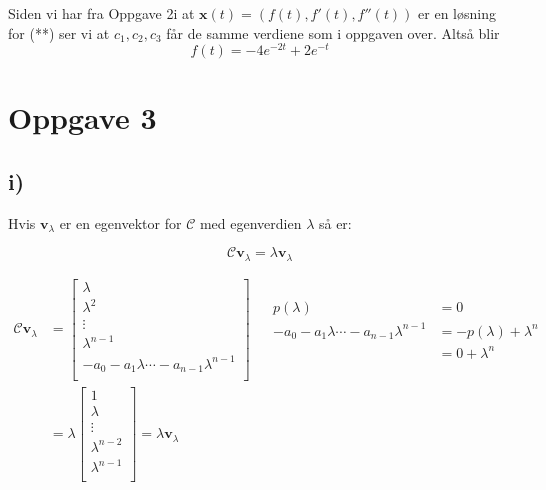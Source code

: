 \documentclass[a4paper, norsk, twoside, 10pt]{article}
\begin{document}
\begin{flushleft}
  Siden vi har fra Oppgave 2i at $\mathbf{x}(t)  = (f(t) , f'(t) , f''(t))$ er en løsning for (**) ser vi at $c_{1}, c_{2}, c_{3}$ får de samme verdiene som i oppgaven over. Altså blir
  \[f(t) = -4e^{-2t} + 2e^{-t}\]



  \section*{Oppgave 3}

  \subsection*{i)}

  Hvis $\mathbf{v}_{\lambda}$ er en egenvektor for $\mathcal{C}$ med egenverdien $\lambda$ så er:

  \[\mathcal{C}\mathbf{v}_{\lambda} = \lambda \mathbf{v}_{\lambda}\]

  \begin{align*}
    \mathcal{C}\mathbf{v}_{\lambda} &=
    \begin{bmatrix}
      \lambda \\
      \lambda^{2} \\
      \vdots \\
      \lambda^{n-1} \\
      -a_{0} - a_{1}\lambda \cdots -a_{n-1}\lambda^{n-1}\\
    \end{bmatrix}
    &\begin{matrix}
       \begin{split}
         p(\lambda) &= 0\\
         -a_{0} - a_{1}\lambda \cdots -a_{n-1}\lambda^{n-1} &= -p(\lambda) + \lambda^{n} \\
         &= 0 +\lambda^{n}
       \end{split}
     \end{matrix} \\
    &= \lambda
    \begin{bmatrix}
      1 \\
      \lambda \\
      \vdots \\
      \lambda^{n-2} \\
      \lambda^{n-1} \\
    \end{bmatrix}
    = \lambda \mathbf{v}_{\lambda}
  \end{align*}


\end{flushleft}
\end{document}
